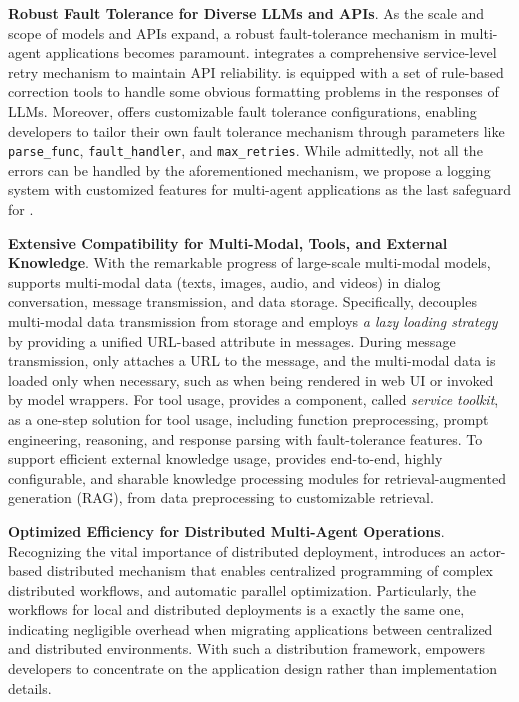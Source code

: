 \textbf{Robust Fault Tolerance for Diverse LLMs and APIs}.
As the scale and scope of models and APIs expand, a robust fault-tolerance mechanism in multi-agent applications becomes paramount. 
\ours integrates a comprehensive service-level retry mechanism to maintain API reliability. 
\ours is equipped with a set of rule-based correction tools to handle some obvious formatting problems in the responses of LLMs. 
Moreover, \ours offers customizable fault tolerance configurations, enabling developers to tailor their own fault tolerance mechanism through parameters like \texttt{parse\_func}, \texttt{fault\_handler}, and \texttt{max\_retries}.
While admittedly, not all the errors can be handled by the aforementioned mechanism, we propose a logging system with customized features for multi-agent applications as the last safeguard for \ours. 

\textbf{Extensive Compatibility for Multi-Modal, Tools, and External Knowledge}. 
With the remarkable progress of large-scale multi-modal models, \ours supports multi-modal data (\eg texts, images, audio, and videos) in dialog conversation, message transmission, and data storage. 
Specifically, \ours decouples multi-modal data transmission from storage and employs \emph{a lazy loading strategy} by providing a unified URL-based attribute in messages. 
During message transmission, \ours only attaches a URL to the message, and the multi-modal data is loaded only when necessary, such as when being rendered in web UI or invoked by model wrappers. 
For tool usage, \ours provides a component, called \emph{service toolkit}, as a one-step solution for tool usage, including function preprocessing, prompt engineering, reasoning, and response parsing with fault-tolerance features.
To support efficient external knowledge usage, \ours provides end-to-end, highly configurable, and sharable knowledge processing modules for retrieval-augmented generation (RAG), from data preprocessing to customizable retrieval.

\textbf{Optimized Efficiency for Distributed Multi-Agent Operations}.
Recognizing the vital importance of distributed deployment, \ours introduces an actor-based distributed mechanism that enables centralized programming of complex distributed workflows, and automatic parallel optimization. 
Particularly, the workflows for local and distributed deployments is a exactly the same one, indicating negligible overhead when migrating applications between centralized and distributed environments. 
With such a distribution framework, \ours empowers developers to concentrate on the application design rather than implementation details. 

